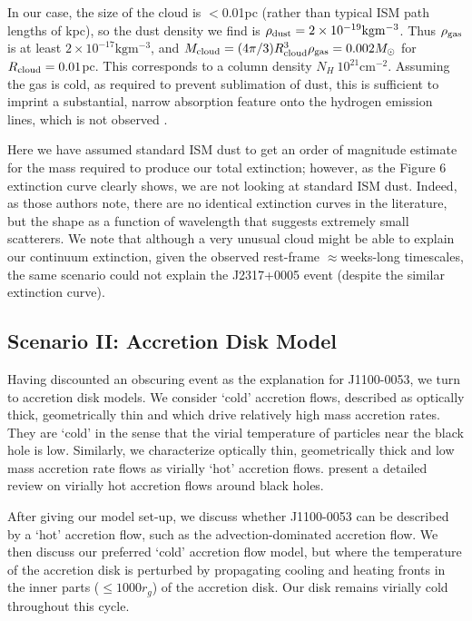 \documentclass[a4paper,fleqn,usenatbib]{mnras}
\begin{document}
In our case, the size of the cloud is $<$0.01pc (rather than typical ISM
path lengths of kpc), so the dust density we find is $\rho_{\rm dust}=2
\times 10^{-19} \mathrm{kg m^{-3}}$.  Thus $\rho_{\rm gas}$ is at least $2
\times 10^{-17} \mathrm{kg m^{-3}}$, and $M_{\rm cloud}=(4 \pi/3)
R_{\rm cloud}^3 \rho_{\rm gas}=0.002 M_{\odot}$ for $R_{\rm cloud}=0.01$pc. This
corresponds to a column density $N_H~10^{21}
\mathrm{cm^{-2}}$. Assuming the gas is cold, as required to prevent
sublimation of dust, this is sufficient to imprint a substantial,
narrow absorption feature onto the hydrogen emission lines, which is
not observed \cite[see e.g.][]{ReesNetzerFerland1989}.

Here we have assumed standard ISM dust to get an order of magnitude
estimate for the mass required to produce our total extinction;
however, as the \citet{Guo2016} Figure 6 extinction curve clearly
shows, we are not looking at standard ISM dust. Indeed, as those 
authors note, there are no identical extinction curves in the
literature, but the shape as a function of wavelength that suggests
extremely small scatterers. We note that although a very unusual cloud
might be able to explain our continuum extinction, given the observed
rest-frame $\approx$weeks-long timescales, the same scenario could not
explain the J2317+0005 event (despite the similar extinction curve).


\subsection{Scenario II: Accretion Disk Model}
Having discounted an obscuring event as the explanation for
J1100-0053, we turn to accretion disk models. We consider `cold'
accretion flows, described as optically thick, geometrically thin and
which drive relatively high mass accretion rates. They are `cold' in
the sense that the virial temperature of particles near the black hole
is low. Similarly, we characterize optically thin, geometrically thick
and low mass accretion rate flows as virially `hot' accretion
flows. \citet{YuanNarayan2014} present a detailed review on virially
hot accretion flows around black holes.

After giving our model set-up, we discuss whether J1100-0053 can be
described by a `hot' accretion flow, such as the advection-dominated
accretion flow. We then discuss our preferred `cold' accretion flow
model, but where the temperature of the accretion disk is perturbed by
propagating cooling and heating fronts in the inner parts ($\leq 1000
r_{g}$) of the accretion disk. Our disk remains virially cold
throughout this cycle.
 
\end{document}

